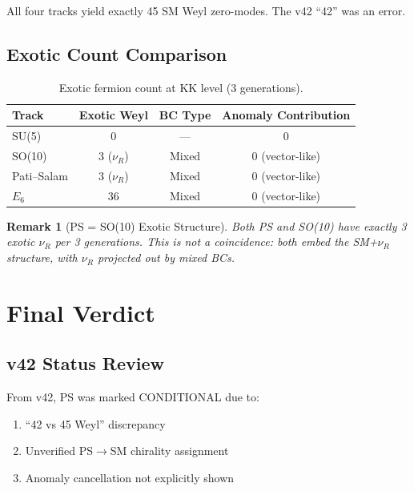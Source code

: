 \documentclass[11pt,a4paper]{article}
\newtheorem{remark}[theorem]{Remark}
\begin{document}
All four tracks yield exactly 45 SM Weyl zero-modes. The v42 ``42'' was an error.

\subsection{Exotic Count Comparison}

\begin{table}[h]
\centering
\caption{Exotic fermion count at KK level (3 generations).}
\label{tab:exotic-comparison}
\begin{tabular}{lccc}
\toprule
Track & Exotic Weyl & BC Type & Anomaly Contribution \\
\midrule
SU(5) & 0 & --- & 0 \\
SO(10) & 3 ($\nu_R$) & Mixed & 0 (vector-like) \\
Pati--Salam & 3 ($\nu_R$) & Mixed & 0 (vector-like) \\
$E_6$ & 36 & Mixed & 0 (vector-like) \\
\bottomrule
\end{tabular}
\end{table}

\begin{remark}[PS = SO(10) Exotic Structure]
\label{rem:ps-so10}
Both PS and SO(10) have exactly 3 exotic $\nu_R$ per 3 generations. This is not a coincidence:
both embed the SM+$\nu_R$ structure, with $\nu_R$ projected out by mixed BCs.
\end{remark}

\section{Final Verdict}
\label{sec:verdict}

\subsection{v42 Status Review}

From v42, PS was marked CONDITIONAL due to:
\begin{enumerate}
    \item ``42 vs 45 Weyl'' discrepancy
    \item Unverified PS$\to$SM chirality assignment
    \item Anomaly cancellation not explicitly shown
\end{enumerate}
\end{document}
